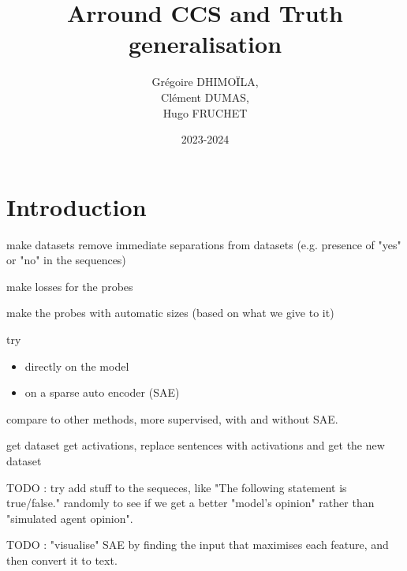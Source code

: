 \documentclass[12pt]{article}
\title{Arround CCS and Truth generalisation}
\author{Grégoire DHIMOÏLA,\\
        Clément DUMAS,\\
        Hugo FRUCHET
}
\date{2023-2024}
\begin{document}
\maketitle

\section{Introduction}

make datasets
remove immediate separations from datasets (e.g. presence of "yes" or "no" in the sequences)

make losses for the probes

make the probes with automatic sizes (based on what we give to it)

try \begin{itemize}
    \item directly on the model
    \item on a sparse auto encoder (SAE)
\end{itemize}

compare to other methods, more supervised, with and without SAE.

get dataset
get activations, replace sentences with activations and get the new dataset

TODO : try add stuff to the sequeces, like "The following statement is true/false." randomly to see if we get a better "model's opinion" rather than "simulated agent opinion".

TODO : "visualise" SAE by finding the input that maximises each feature, and then convert it to text.
\end{document}
